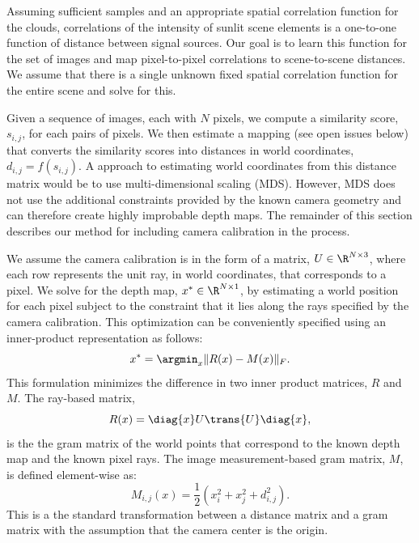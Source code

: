 Assuming sufficient samples and an appropriate spatial correlation
function for the clouds, correlations of the intensity of sunlit scene
elements is a one-to-one function of distance between signal sources.
Our goal is to learn this function for the set of images and map
pixel-to-pixel correlations to scene-to-scene distances.  We assume
that there is a single unknown fixed spatial correlation function for
the entire scene and solve for this.


Given a sequence of images, each with $N$ pixels, we compute a
similarity score, $s_{i,j}$, for each pairs of pixels. We then
estimate a mapping (see open issues below) that converts the
similarity scores into distances in world coordinates, $d_{i,j} =
f(s_{i,j})$.  A \naive approach to estimating world coordinates from
this distance matrix would be to use multi-dimensional scaling (MDS).
However, MDS does not use the additional constraints provided by the
known camera geometry and can therefore create highly improbable depth
maps. The remainder of this section describes our method for including
camera calibration in the process.

We assume the camera calibration is in the form of a matrix, $U \in
\R^{N \times 3}$, where each row represents the unit ray, in world
coordinates, that corresponds to a pixel.  We solve for the depth map,
$x^*\in\R^{N\times1}$, by estimating a world position for each pixel
subject to the constraint that it lies along the rays specified by the
camera calibration.  This optimization can be conveniently specified
using an inner-product representation as follows:
\begin{equation}
  x^* = \argmin_x \| R(x)  - M(x) \|_F.
\end{equation}
This formulation minimizes the difference in two inner product
matrices, $R$ and $M$. The ray-based matrix,
\begin{equation}
  R(x) = \diag{x}U\trans{U}\diag{x},
\end{equation}
is the the gram matrix of the world points that correspond to the
known depth map and the known pixel rays.  The image measurement-based
gram matrix, $M$, is defined element-wise as:
\begin{equation}
  M_{i,j}(x) = \frac{1}{2}\left( x_i^2 + x_j^2 + d_{i,j}^2 \right).
\end{equation}
This is a the standard transformation between a distance matrix and a
gram matrix with the assumption that the camera center is the origin.

